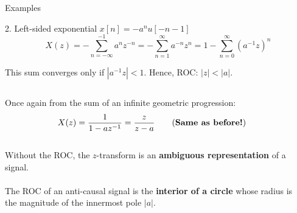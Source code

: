 \documentclass[10pt, handout]{beamer}
\begin{document}
%
\begin{frame}{Examples}
\begin{block}{2. Left-sided exponential $x[n] = -a^nu[-n-1]$}
	\begin{equation*} 
	X(z) = -\sum_{n=-\infty}^{-1} a^nz^{-n} = -\sum_{n=1}^{\infty} a^{-n}z^{n} = 1-\sum_{n=0}^{\infty} (a^{-1}z)^{n}
	\end{equation*}
	
	This sum converges only if $|a^{-1}z| < 1$. Hence, ROC: $|z| < |a|$.
	
	\begin{columns}
		\begin{column}{0.6\textwidth}
			Once again from the sum of an infinite geometric progression:
			\begin{equation*} 
				X(z) = \frac{1}{1-az^{-1}} = \frac{z}{z-a}\tag{\textbf{Same as before!}}
			\end{equation*}
			~\\
			Without the ROC, the $z$-transform is an \textbf{ambiguous representation} of a signal.
			~\\
			~\\
			The ROC of an anti-causal signal is the \textbf{interior of a circle} whose radius is the magnitude of the innermost pole $|a|$.
		\end{column}
		\begin{column}{0.4\textwidth}  %
			\resizebox{1.18\linewidth}{!}{}
		\end{column}
	\end{columns}
	
\end{block}
\end{frame}
\end{document}
